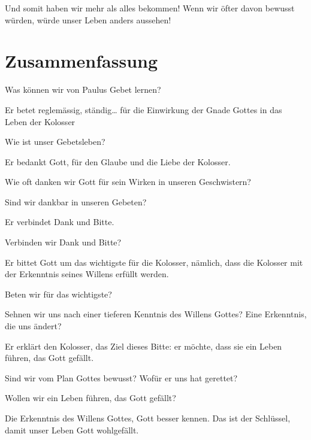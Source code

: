 \documentclass[
  12pt,
]{krantz}
\makeatletter
\newenvironment{kframe}{%
\medskip{}
\setlength{\fboxsep}{.8em}
 \def\at@end@of@kframe{}%
 \ifinner\ifhmode%
  \def\at@end@of@kframe{\end{minipage}}%
  \begin{minipage}{\columnwidth}%
 \fi\fi%
 \def\FrameCommand##1{\hskip\@totalleftmargin \hskip-\fboxsep
 \colorbox{shadecolor}{##1}\hskip-\fboxsep
     \hskip-\linewidth \hskip-\@totalleftmargin \hskip\columnwidth}%
 \MakeFramed {\advance\hsize-\width
   \@totalleftmargin\z@ \linewidth\hsize
   \@setminipage}}%
 {\par\unskip\endMakeFramed%
 \at@end@of@kframe}
\newenvironment{rmdblock}[1]
  {
  \begin{itemize}
  \renewcommand{\labelitemi}{
    \raisebox{-.7\height}[0pt][0pt]{
      {\setkeys{Gin}{width=3em,keepaspectratio}\texttt{[image: img/\#1]}}
    }
  }
  \setlength{\fboxsep}{1em}
  \begin{kframe}
  \item
  }
  {
  \end{kframe}
  \end{itemize}
  }
\newenvironment{rmdquestion}
  {\begin{rmdblock}{question}}
  {\end{rmdblock}}
\makeatother
\begin{document}
Und somit haben wir mehr als alles bekommen! Wenn wir öfter davon bewusst würden, würde unser Leben anders aussehen!

\hypertarget{zusammenfassung}{%
\section{Zusammenfassung}\label{zusammenfassung}}

Was können wir von Paulus Gebet lernen?

Er betet reglemässig, ständig\ldots{} für die Einwirkung der Gnade Gottes in das Leben der Kolosser

\begin{rmdquestion}
Wie ist unser Gebetsleben?
\end{rmdquestion}

Er bedankt Gott, für den Glaube und die Liebe der Kolosser.

\begin{rmdquestion}
Wie oft danken wir Gott für sein Wirken in unseren Geschwistern?

Sind wir dankbar in unseren Gebeten?
\end{rmdquestion}

Er verbindet Dank und Bitte.

\begin{rmdquestion}
Verbinden wir Dank und Bitte?
\end{rmdquestion}

Er bittet Gott um das wichtigste für die Kolosser, nämlich, dass die Kolosser mit der Erkenntnis seines Willens erfüllt werden.

\begin{rmdquestion}
Beten wir für das wichtigste?

Sehnen wir uns nach einer tieferen Kenntnis des Willens Gottes? Eine
Erkenntnis, die uns ändert?
\end{rmdquestion}

Er erklärt den Kolosser, das Ziel dieses Bitte: er möchte, dass sie ein Leben führen, das Gott gefällt.

\begin{rmdquestion}
Sind wir vom Plan Gottes bewusst? Wofür er uns hat gerettet?

Wollen wir ein Leben führen, das Gott gefällt?
\end{rmdquestion}

Die Erkenntnis des Willens Gottes, Gott besser kennen. Das ist der Schlüssel, damit unser Leben Gott wohlgefällt.
\end{document}
